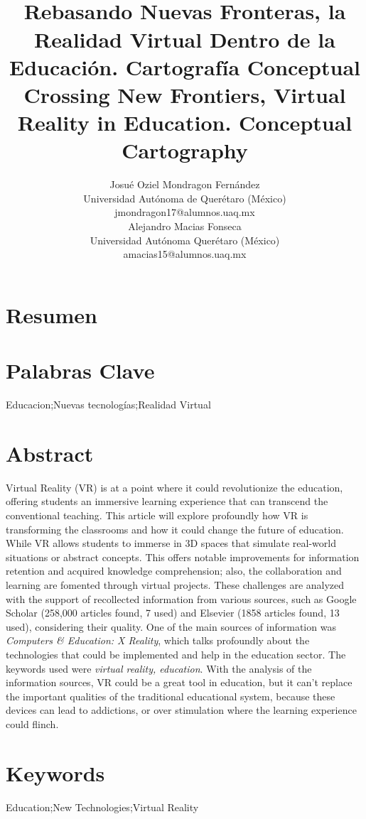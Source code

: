 \documentclass[11pt]{article}
\title{\color{blue}{\fontsize{10}{12}~}\\{\arialblk\fontsize{14}{17}\selectfont Rebasando Nuevas Fronteras, la Realidad Virtual Dentro de la Educación. Cartografía Conceptual}\\{\barial\fontsize{12}{14}\selectfont Crossing New Frontiers, Virtual Reality in Education. Conceptual Cartography}}
\author{
   {\arial\fontsize{12}{14}\selectfont Josué Oziel Mondragon Fernández}\\
   {\arial\fontsize{10}{12}\selectfont Universidad Autónoma de Querétaro (México)}\\
   {\arial\fontsize{10}{12}\selectfont jmondragon17@alumnos.uaq.mx}\\
   {\arial\fontsize{12}{14}\selectfont Alejandro Macias Fonseca}\\
   {\arial\fontsize{10}{12}\selectfont Universidad Autónoma Querétaro (México)}\\
   {\arial\fontsize{10}{12}\selectfont amacias15@alumnos.uaq.mx}\\
}
\date{}
\begin{document}
\maketitle
\begin{tcolorbox}[colback=introblock,colframe=introblock]
\section*{\fontsize{10}{12}\barial Resumen}
      {\fontsize{10}{12}} 

\section*{\fontsize{10}{12}\barial Palabras Clave}
   {\fontsize{10}{12}Educacion;Nuevas tecnologías;Realidad Virtual}
\end{tcolorbox}

\begin{tcolorbox}[colback=introblock,colframe=introblock]
\section*{\fontsize{10}{12}\barial Abstract}
      {\fontsize{10}{12}Virtual Reality (VR) is at a point where it could revolutionize the education, offering students an immersive learning experience that can transcend the conventional teaching. This article will explore profoundly how VR is transforming the classrooms and how it could change the future of education. While VR allows students to immerse in 3D spaces that simulate real-world situations or abstract concepts. This offers notable improvements for information retention and acquired knowledge comprehension; also, the collaboration and learning are fomented through virtual projects. These challenges are analyzed with the support of recollected information from various sources, such as Google Scholar (258,000 articles found, 7 used) and Elsevier (1858 articles found, 13 used), considering their quality. One of the main sources of information was \textit{Computers \& Education: X Reality}, which talks profoundly about the technologies that could be implemented and help in the education sector. The keywords used were \textit{virtual reality, education}. With the analysis of the information sources, VR could be a great tool in education, but it can't replace the important qualities of the traditional educational system, because these devices can lead to addictions, or over stimulation where the learning experience could flinch.}

\section*{\fontsize{10}{12}\barial Keywords}
   {\fontsize{10}{12}Education;New Technologies;Virtual Reality}
\end{tcolorbox}



\printbibliography
\end{document}
